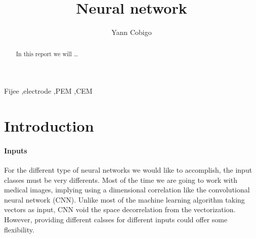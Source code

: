 \documentclass[final, paper=letter,5p,times,twocolumn]{elsarticle}
\begin{document}
\begin{frontmatter}

\title{Neural network}

\author[label1]{Yann Cobigo}
\address[label1]{University of California, San Francisco | ucsf.edu}




\begin{abstract}
In this report we will \dots
\end{abstract}

\begin{keyword}
Fijee \sep electrode \sep PEM \sep CEM
\end{keyword}

\end{frontmatter}


\section{Introduction}

\paragraph{Inputs}{For the different type of neural networks we would like to accomplish, the input classes must be very differents. Most of the time we are going to work with medical images, implying using a dimensional correlation like the convolutional neural network (CNN). Unlike most of the machine learning algorithm taking vectors as input, CNN void the space decorrelation from the vectorization. However, providing different calsses for different inputs could offer some flexibility.}
\end{document}
